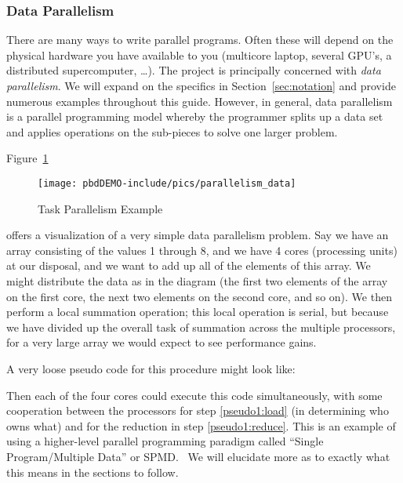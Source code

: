 \subsubsection{Data Parallelism}

There are many ways to write parallel programs. Often these will depend on
the physical hardware you have available to you (multicore laptop, several
GPU's, a distributed supercomputer, \dots). The  project is
principally concerned with \emph{data parallelism}. We will expand on the
specifics in Section~\ref{sec:notation} and provide numerous examples
throughout this guide. However, in general, data parallelism is a parallel
programming model whereby the programmer splits up a data set and applies
operations on the sub-pieces to solve one larger problem.

Figure~\ref{fig:dataparallel} 
\begin{figure}[h]
 \centering
 \texttt{[image: pbdDEMO-include/pics/parallelism\_data]}
 \caption{Task Parallelism Example}
 \label{fig:dataparallel}
\end{figure}
offers a visualization of a very simple data parallelism problem. Say we
have an array consisting of the values 1 through 8, and we have 4 cores
(processing units) at our disposal, and we want to add up all of the elements
of this array. We might distribute the data as in the diagram (the first
two elements of the array on the first core, the next two elements on the
second core, and so on). We then perform a local summation operation;
this local operation is serial, but because we have divided up the overall
task of summation across the multiple processors, for a very large array
we would expect to see performance gains.

A very loose pseudo code for this procedure might look like:


Then each of the four cores could execute this code simultaneously, with some
cooperation between the processors for step \ref{pseudo1:load} (in determining
who owns what) and for the reduction in step \ref{pseudo1:reduce}. This is
an example of using a higher-level parallel programming paradigm called
``Single Program/Multiple Data''
or SPMD.~
We will elucidate more as to exactly what this means in the sections to follow.



